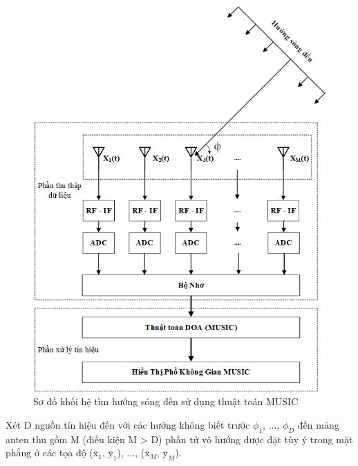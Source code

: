 \begin{figure} [!h]
	\centering
	\includegraphics[width=0.75\linewidth]{figures/MuSIC_Structor.png}
	\caption{Sơ đồ khối hệ tìm hướng sóng đến sử dụng thuật toán MUSIC}
	\label{fig:musicstruct}
\end{figure}

Xét D nguồn tín hiệu đến với các hướng không biết trước $\phi_{1}$, ..., $\phi_{D}$ đến mảng anten thu gồm M (điều kiện M > D) phần tử vô hướng được đặt tùy ý trong mặt phẳng ở các tọa độ ($\bar{\mathrm{x}}_1$, $\bar{\mathrm{y}}_1$), ..., ($\bar{\mathrm{x}}_M$, $\bar{\mathrm{y}}_M$).

